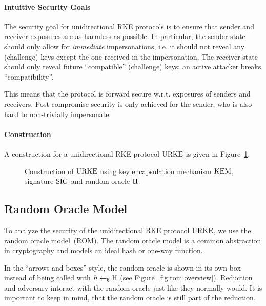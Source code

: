 \paragraph{Intuitive Security Goals} The security goal for unidirectional RKE protocols is to ensure that sender and receiver exposures are as harmless as possible.
In particular, the sender state should only allow for \emph{immediate} impersonations, i.e. it should not reveal any (challenge) keys except the one received in the impersonation.
The receiver state should only reveal future ``compatible'' (challenge) keys; an active attacker breaks ``compatibility''.

This means that the protocol is forward secure w.r.t. exposures of senders and receivers.
Post-compromise security is only achieved for the sender, who is also hard to non-trivially impersonate.


\paragraph{Construction} A construction for a unidirectional RKE protocol $\mathrm{URKE}$ is given in Figure~\ref{fig:urke:const}.

\begin{figure}[!ht]
    \centering
    \nicoresetlinenr%
    \fbox{%
        \scalebox{\codescalefactor}{%
        }%
    }
    \caption{%
        Construction of $\mathrm{URKE}$ using key encapsulation mechanism $\mathrm{KEM}$, signature $\mathrm{SIG}$ and random oracle $\mathrm{H}$.
    }
    \label{fig:urke:const}
\end{figure}

\subsection{Random Oracle Model}

To analyze the security of the unidirectional RKE protocol $\mathrm{URKE}$, we use the random oracle model~(ROM).
The random oracle model is a common abstraction in cryptography and models an ideal hash or one-way function.

In the ``arrows-and-boxes'' style, the random oracle is shown in its own box instead of being called with $h\gets_\$ \mathrm{H}$ (see Figure~\ref{fig:rom:overview}).
Reduction and adversary interact with the random oracle just like they normally would.
It is important to keep in mind, that the random oracle is still part of the reduction.


